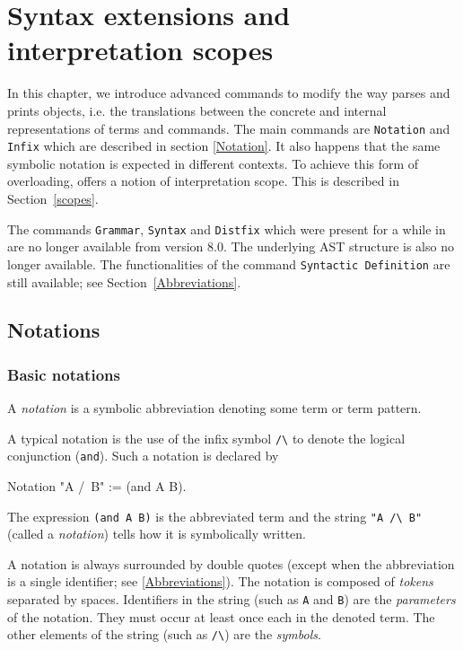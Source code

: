 \chapter[Syntax extensions and interpretation scopes]{Syntax extensions and interpretation scopes\label{Addoc-syntax}}

In this chapter, we introduce advanced commands to modify the way
{\Coq} parses and prints objects, i.e. the translations between the
concrete and internal representations of terms and commands. The main
commands are {\tt Notation} and {\tt Infix} which are described in
section \ref{Notation}.  It also happens that the same symbolic
notation is expected in different contexts. To achieve this form of
overloading, {\Coq} offers a notion of interpretation scope. This is
described in Section~\ref{scopes}.

\Rem The commands {\tt Grammar}, {\tt Syntax} and {\tt Distfix} which
were present for a while in {\Coq} are no longer available from {\Coq}
version 8.0. The underlying AST structure is also no longer available.
The functionalities of the command {\tt Syntactic Definition} are
still available; see Section~\ref{Abbreviations}.

\section[Notations]{Notations\label{Notation}
}

\subsection{Basic notations}

A {\em notation} is a symbolic abbreviation denoting some term
or term pattern.

A typical notation is the use of the infix symbol \verb=/\= to denote
the logical conjunction (\texttt{and}). Such a notation is declared
by

\begin{coq_example*}
Notation "A /\ B" := (and A B).
\end{coq_example*}

The expression \texttt{(and A B)} is the abbreviated term and the
string \verb="A /\ B"= (called a {\em notation}) tells how it is 
symbolically written.

A notation is always surrounded by double quotes (except when the
abbreviation is a single identifier; see \ref{Abbreviations}). The
notation is composed of {\em tokens} separated by spaces.  Identifiers
in the string (such as \texttt{A} and \texttt{B}) are the {\em
parameters} of the notation. They must occur at least once each in the
denoted term. The other elements of the string (such as \verb=/\=) are
the {\em symbols}.

